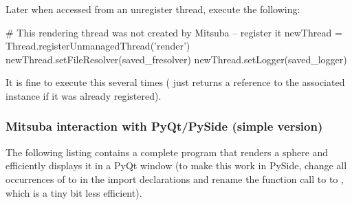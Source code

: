 Later when accessed from an unregister thread, execute the following:
\begin{python}
# This rendering thread was not created by Mitsuba -- register it
newThread = Thread.registerUnmanagedThread('render')
newThread.setFileResolver(saved_fresolver)
newThread.setLogger(saved_logger)
\end{python}
It is fine to execute this several times ( just returns
a reference to the associated  instance if it was already registered).

\subsubsection{Mitsuba interaction with PyQt/PySide (simple version)}
The following listing contains a complete program that
renders a sphere and efficiently displays it in a PyQt window
(to make this work in PySide, change all occurrences of  to  in the
import declarations and rename the function call to  to ,
which is a tiny bit less efficient).
